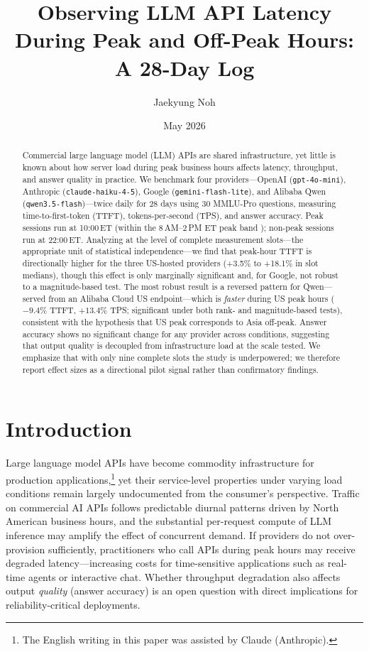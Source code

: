 \documentclass[11pt]{article}
\title{\textbf{Observing LLM API Latency During Peak and Off-Peak Hours:\\
A 28-Day Log}}
\author[1]{Jaekyung Noh}
\affil[1]{Independent Researcher \\ \texttt{silverbreak1@gmail.com}}
\date{May 2026}
\begin{document}
\maketitle

\begin{abstract}
Commercial large language model (LLM) APIs are shared infrastructure, yet little is known
about how server load during peak business hours affects latency, throughput, and answer
quality in practice.
We benchmark four providers---OpenAI (\texttt{gpt-4o-mini}), Anthropic
(\texttt{claude-haiku-4-5}), Google (\texttt{gemini-flash-lite}), and Alibaba Qwen
(\texttt{qwen3.5-flash})---twice daily for 28 days using 30 MMLU-Pro questions, measuring
time-to-first-token (TTFT), tokens-per-second (TPS), and answer accuracy.
Peak sessions run at 10:00\,ET (within the 8\,AM--2\,PM ET peak band \citep{anthropic2026promotion});
non-peak sessions run at 22:00\,ET.
Analyzing at the level of complete measurement slots---the appropriate unit of
statistical independence---we find that peak-hour TTFT is directionally higher for the
three US-hosted providers (+3.5\% to +18.1\% in slot medians), though this effect is
only marginally significant and, for Google, not robust to a magnitude-based test.
The most robust result is a reversed pattern for Qwen---served from an Alibaba Cloud
US endpoint---which is \emph{faster} during US peak hours ($-9.4\%$ TTFT, $+13.4\%$ TPS;
significant under both rank- and magnitude-based tests), consistent with the hypothesis
that US peak corresponds to Asia off-peak.
Answer accuracy shows no significant change for any provider across conditions,
suggesting that output quality is decoupled from infrastructure load at the scale tested.
We emphasize that with only nine complete slots the study is underpowered; we therefore
report effect sizes as a directional pilot signal rather than confirmatory findings.
\end{abstract}

\section{Introduction}

Large language model APIs have become commodity infrastructure for production applications,\footnote{The English writing in this paper was assisted by Claude (Anthropic).}
yet their service-level properties under varying load conditions remain largely undocumented
from the consumer's perspective.
Traffic on commercial AI APIs follows predictable diurnal patterns driven by North American
business hours, and the substantial per-request compute of LLM inference may amplify the
effect of concurrent demand.
If providers do not over-provision sufficiently, practitioners who call APIs during peak hours
may receive degraded latency---increasing costs for time-sensitive applications such as
real-time agents or interactive chat.
Whether throughput degradation also affects output \emph{quality} (answer accuracy) is an
open question with direct implications for reliability-critical deployments.
\end{document}
